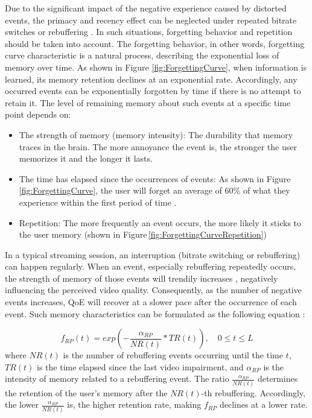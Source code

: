 Due to the significant impact of the negative experience caused by distorted events, the primacy and recency effect can be neglected under repeated bitrate switches or rebuffering \cite{EffectSizesOfInfluenceFactors}. In such situations, forgetting behavior and repetition should be taken into account. The forgetting behavior, in other words, forgetting curve characteristic \cite{Ebbinghaus_ForgettingCurve} is a natural process, describing the exponential loss of memory over time. As shown in Figure \ref{fig:ForgettingCurve}, when information is learned, its memory retention declines at an exponential rate. Accordingly, any occurred events can be exponentially forgotten by time if there is no attempt to retain it. The level of remaining memory about such events at a specific time point depends on:

\begin{itemize}
  \item The strength of memory (memory intensity): The durability that memory traces in the brain. The more annoyance the event is, the stronger the user memorizes it and the longer it lasts.
  \item The time has elapsed since the occurrences of events: As shown in Figure\,\ref{fig:ForgettingCurve}, the user will forget an average of 60\% of what they experience within the first period of time \cite{EvaluatingForgettingCurves,Ebbinghaus_ForgettingCurve}.
  \item Repetition: The more frequently an event occurs, the more likely it sticks to the user memory (shown in Figure\,\ref{fig:ForgettingCurveRepetition})
\end{itemize}

In a typical streaming session, an interruption (bitrate switching or rebuffering) can happen regularly. When an event, especially rebuffering repeatedly occurs, the strength of memory of those events will trendily increases \cite{Ebbinghaus_ForgettingCurve}, negatively influencing the perceived video quality. Consequently, as the number of negative events increases, QoE will recover at a slower pace after the occurrence of each event. Such memory characteristics can be formulated as the following equation \cite{TwoComponentsOfMemory}:
    
\begin{equation} \label{eqn:Repetition}
  f_{RP}(t) = exp(-\frac{\alpha_{RP}}{NR(t)} * TR(t)), \quad 0 \leq t \leq L
\end{equation}
where $NR(t)$ is the number of rebuffering events occurring until the time $t$, $TR(t)$ is the time elapsed since the last video impairment, and $\alpha_{RP}$ is the intensity of memory related to a rebuffering event. The ratio $\frac{\alpha_{RP}}{NR(t)}$ determines the retention of the user's memory after the $NR(t)$-th rebuffering. Accordingly, the lower $\frac{\alpha_{RP}}{NR(t)}$ is, the higher retention rate, making $f_{RP}$ declines at a lower rate. 



